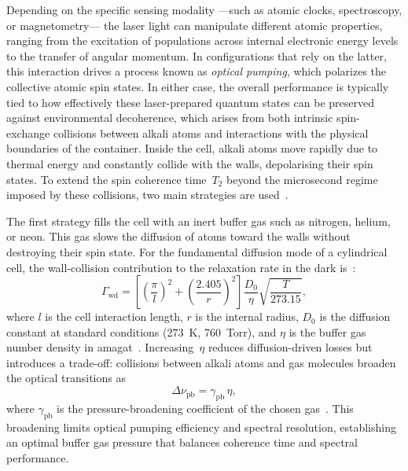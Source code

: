 Depending on the specific sensing modality ---such as atomic clocks, 
spectroscopy, or magnetometry--- the laser light can manipulate 
different atomic properties, ranging from the excitation of 
populations across internal electronic energy levels to the transfer 
of angular momentum. In configurations that rely on the latter, 
this interaction drives a process known as \textit{optical pumping}, 
which polarizes the collective atomic spin states. In either case, 
the overall performance is typically tied to how effectively 
these laser-prepared quantum states can be preserved against 
environmental decoherence, which arises from both intrinsic 
spin-exchange collisions between alkali atoms and interactions with 
the physical boundaries of the container. 
Inside the cell, alkali atoms move rapidly due to thermal energy
and constantly collide with the walls, depolarising their spin
states. To extend the spin coherence time~$T_2$ beyond the
microsecond regime imposed by these collisions, two main
strategies are used~\cite{brown2025}.

The first strategy fills the cell with an inert buffer gas such
as nitrogen, helium, or neon. This gas slows the diffusion of
atoms toward the walls without destroying their spin state. For
the fundamental diffusion mode of a cylindrical cell, the
wall-collision contribution to the relaxation rate in the dark
is~\cite{lucivero2022}:
\begin{equation}
    \Gamma_\text{wd} = \left[ \left(\frac{\pi}{l}\right)^2
                       + \left(\frac{2.405}{r}\right)^2 \right]
                       \frac{D_0}{\eta}\sqrt{\frac{T}{273.15}},
    \label{eq:wall_relaxation}
\end{equation}
where $l$ is the cell interaction length, $r$ is the internal
radius, $D_0$ is the diffusion constant at standard conditions
(273~K, 760~Torr), and $\eta$ is the buffer gas number density
in amagat~\cite{lucivero2022}. Increasing~$\eta$ reduces
diffusion-driven losses but introduces a trade-off: collisions
between alkali atoms and gas molecules broaden the optical
transitions as
\begin{equation}
    \Delta\nu_\text{pb} = \gamma_\text{pb}\,\eta,
    \label{eq:pressure_broadening}
\end{equation}
where $\gamma_\text{pb}$ is the pressure-broadening coefficient
of the chosen gas~\cite{lucivero2022}. This broadening limits
optical pumping efficiency and spectral resolution, establishing
an optimal buffer gas pressure that balances coherence time and
spectral performance.

